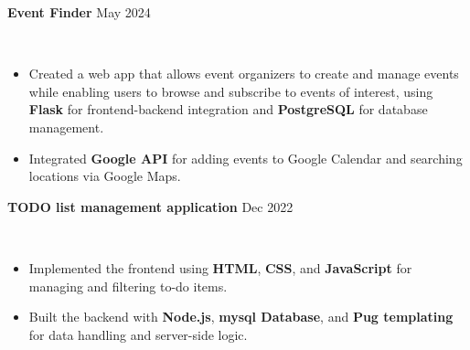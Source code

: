 \documentclass{cv}
\newcommand*{\labelfont}{\fontfamily{bch}\selectfont}
\begin{document}
{\labelfont \textbf{Event Finder} \hspace*{14.8cm}\hspace{1.5mm}\hspace{1.5mm}May 2024}
{
\small
\vspace{-27pt}\\
\begin{itemize}
\setlength\itemsep{-2.5pt}
    \item Created a web app that allows event organizers to create and manage events while enabling users to browse and subscribe to events of interest, using \textbf{Flask} for frontend-backend integration and \textbf{PostgreSQL} for database management.
    \item Integrated \textbf{Google API} for adding events to Google Calendar and searching locations via Google Maps.
\end{itemize}
}

{\labelfont \textbf{TODO list management application} \hspace*{10.8cm} \hspace{1.5mm}\hspace{1.5mm}Dec 2022}
{
\small
\vspace{-26pt}\\
\begin{itemize}
\setlength\itemsep{-2.5pt}
    \item Implemented the frontend using \textbf{HTML}, \textbf{CSS}, and \textbf{JavaScript} for managing and filtering to-do items.
    \item Built the backend with \textbf{Node.js}, \textbf{mysql Database}, and \textbf{Pug templating} for data handling and server-side logic.
\end{itemize}
}

\end{document}
